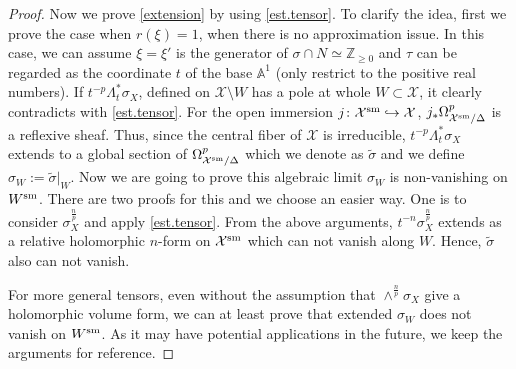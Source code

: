 \documentclass[12pt,a4paper]{amsart}
\theoremstyle{remark}
\theoremstyle{definition}
\def\Z{\mathbb{Z}}
\def\A{\mathbb{A}}
\def\X{\mathcal{X}}
\begin{document}
\begin{proof}
Now we prove \eqref{extension} by using \eqref{est.tensor}. 
To clarify the idea, first we prove the case when $r(\xi)=1$, when there is no approximation issue. 
In this case, we can assume $\xi=\xi'$ is the generator of 
$\sigma\cap N\simeq \Z_{\ge 0}$ and $\tau$ can be regarded as the coordinate $t$ 
of the base $\A^1$ (only restrict to the positive real numbers). 
If $t^{-p}\Lambda_t^* \sigma_X$, 
defined on $\mathcal{X}\setminus W$ 
has a pole at whole $W\subset \X$, 
it clearly contradicts with 
\eqref{est.tensor}. 
For the open immersion $j\colon \mathcal{X}^{\rm sm}\hookrightarrow\mathcal{X}$, 
$j_* \Omega_{\X^{\rm sm}/\Delta}^p$ is a reflexive 
sheaf. 
Thus, since the central fiber of $\mathcal{X}$ is 
irreducible, 
$t^{-p}\Lambda_t^* \sigma_X$ 
extends to a global section of 
$\Omega^p_{\X^{\rm sm}/\Delta}$ which we denote as 
$\tilde{\sigma}$ and we define 
$\sigma_W:=\tilde{\sigma}|_W$. 
Now we are going to prove this algebraic limit 
$\sigma_W$ is non-vanishing on $W^{\rm sm}$. 
There are two proofs for this and we choose an easier way. 
One is to consider 
$\sigma_X^{\frac{n}{p}}$ and apply \eqref{est.tensor}. 
From the above arguments, $t^{-n}\sigma_X^{\frac{n}{p}}$ 
extends as a relative holomorphic $n$-form on $\X^{\rm sm}$ 
which can not vanish along $W$. Hence, $\tilde{\sigma}$ 
also can not vanish. 

For more general tensors, even without the assumption 
that 
 $\wedge^{\frac{n}{p}} \sigma_X$ give a holomorphic volume form, 
 we can at least prove that extended 
 $\sigma_W$ does not vanish on $W^{\rm sm}$. As it may 
 have 
 potential applications in the future, we keep the arguments for reference. 


\end{proof}
\end{document}
